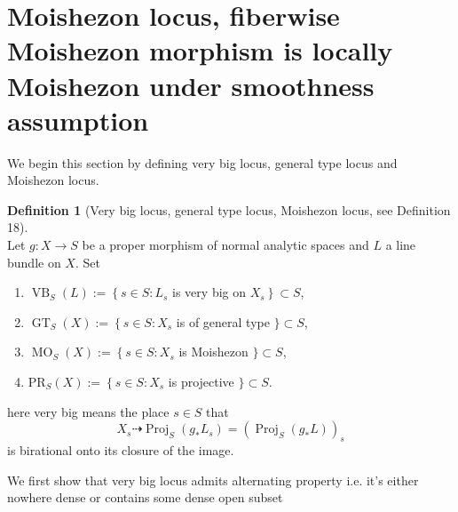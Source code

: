 \documentclass[11pt]{article}
\theoremstyle{definition}
\newtheorem{definition}[theorem]{Definition}
\begin{document}
	
	\section{Moishezon locus, fiberwise Moishezon morphism is locally Moishezon under smoothness assumption}
	
	We begin this section by defining very big locus, general type locus and Moishezon locus. 
	\begin{definition}[Very big locus, general type locus, Moishezon locus, see \cite{Moishezonmorphism} Definition 18]~\\
	Let $g: X \rightarrow S$ be a proper morphism of normal analytic spaces and $L$ a line bundle on $X$. Set
	\begin{enumerate}
		\item  $\operatorname{VB}_S(L):=\left\{s \in S: L_s\right.$ is very big on $\left.X_s\right\} \subset S$,
		\item $\operatorname{GT}_S(X):=\left\{s \in S: X_s\right.$ is of general type $\} \subset S$,
		\item $\operatorname{MO}_S(X):=\left\{s \in S: X_s\right.$ is Moishezon $\} \subset S$,
		\item $\mathrm{PR}_S(X):=\left\{s \in S: X_s\right.$ is projective $\} \subset S$.
	\end{enumerate}
	here very big means the place $s\in S$ that $$X_s \dashrightarrow \operatorname{Proj}_S(g_* L_s) = (\operatorname{Proj}_S(g_* L))_s$$is birational onto its closure of the image. 
	\end{definition}
	We first show that very big locus admits alternating property i.e. it's either nowhere dense or contains some dense open subset
	
\end{document}

